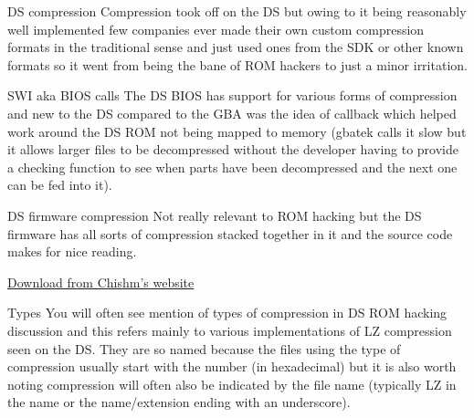 \documentclass[
]{book}
\begin{document}
DS compression Compression took off on the DS but owing to it being reasonably well implemented few companies ever made their own custom compression formats in the traditional sense and just used ones from the SDK or other known formats so it went from being the bane of ROM hackers to just a minor irritation.

SWI aka BIOS calls The DS BIOS has support for various forms of compression and new to the DS compared to the GBA was the idea of callback which helped work around the DS ROM not being mapped to memory (gbatek calls it slow but it allows larger files to be decompressed without the developer having to provide a checking function to see when parts have been decompressed and the next one can be fed into it).

DS firmware compression Not really relevant to ROM hacking but the DS firmware has all sorts of compression stacked together in it and the source code makes for nice reading.

\href{http://chishm.drunkencoders.com/NDS_Projects/fwunpack.zip}{Download from Chishm's website}

Types You will often see mention of types of compression in DS ROM hacking discussion and this refers mainly to various implementations of LZ compression seen on the DS. They are so named because the files using the type of compression usually start with the number (in hexadecimal) but it is also worth noting compression will often also be indicated by the file name (typically LZ in the name or the name/extension ending with an underscore).
\end{document}
